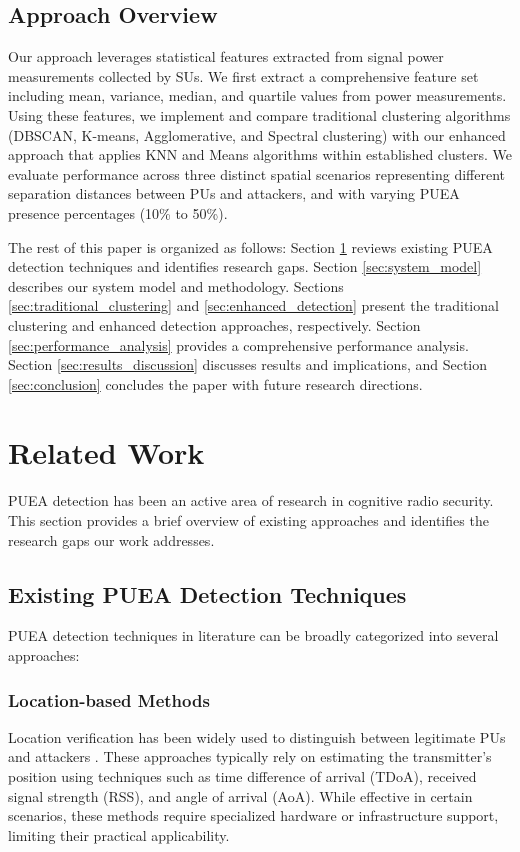 \documentclass[conference]{IEEEtran}
\begin{document}
\subsection{Approach Overview}
Our approach leverages statistical features extracted from signal power measurements collected by SUs. We first extract a comprehensive feature set including mean, variance, median, and quartile values from power measurements. Using these features, we implement and compare traditional clustering algorithms (DBSCAN, K-means, Agglomerative, and Spectral clustering) with our enhanced approach that applies KNN and Means algorithms within established clusters. We evaluate performance across three distinct spatial scenarios representing different separation distances between PUs and attackers, and with varying PUEA presence percentages (10\% to 50\%).

The rest of this paper is organized as follows: Section \ref{sec:related_work} reviews existing PUEA detection techniques and identifies research gaps. Section \ref{sec:system_model} describes our system model and methodology. Sections \ref{sec:traditional_clustering} and \ref{sec:enhanced_detection} present the traditional clustering and enhanced detection approaches, respectively. Section \ref{sec:performance_analysis} provides a comprehensive performance analysis. Section \ref{sec:results_discussion} discusses results and implications, and Section \ref{sec:conclusion} concludes the paper with future research directions.

\section{Related Work}
\label{sec:related_work}

PUEA detection has been an active area of research in cognitive radio security. This section provides a brief overview of existing approaches and identifies the research gaps our work addresses.

\subsection{Existing PUEA Detection Techniques}

PUEA detection techniques in literature can be broadly categorized into several approaches:

\subsubsection{Location-based Methods}
Location verification has been widely used to distinguish between legitimate PUs and attackers \cite{chen2008defense, liu2010aldo}. These approaches typically rely on estimating the transmitter's position using techniques such as time difference of arrival (TDoA), received signal strength (RSS), and angle of arrival (AoA). While effective in certain scenarios, these methods require specialized hardware or infrastructure support, limiting their practical applicability.
\end{document}
